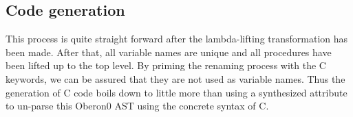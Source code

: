 \begin{comment}
The control flow extension \textit{does} provide equations for type checking,
however, for the same reason some type checking was done for desugaring previously:
error message quality.
%
Although the transformed trees should be semantically equivalent, that only
extends to whether it is accepted/rejected by analysis, not whether the error
messages generated are sensible.
%
It would be very confusing to see an error about an \texttt{IF} condition
not being a boolean when the program contains a \texttt{CASE} statement, instead.
%
By providing definitions for attributes involved in type checking, we can
get not only nice error messages, but also ensure the safety of composition.
\end{comment}

\begin{comment}
\paragraph{Dispatching} %
Forwarding takes on many roles in Silver specifications.
%
One common one in larger compilers, that's we've forced to take a slightly
contrived role in Oberon0, is that of \textit{dispatch}.
%
It's often the case that the behavior of a production as a whole will end up
very different depending, for example, what kind of identifier is referenced
by a name, as determined by an environment lookup.
%
In the Silver compiler itself, for example, a global value lookup and a local
value do not just have very different translations, but the type behavior is
different too: globals are quantified and should have their type variable freshened
before reporting a monotype, while locals are not.

For Oberon0, we have a special handler for the builtin procedure \texttt{WriteLn}
and so forth, becuase we need to give them a special translation.
%
To do this, the procedure call production \texttt{callDispatch} forwards to one
of \texttt{call}, \texttt{writeLnCall}, etc based on the procedure name.
\end{comment}

\subsection{Code generation}


This process is quite straight forward after the lambda-lifting
transformation has been made.  After that, all variable names are
unique and all procedures have been lifted up to the top level.  By
priming the renaming process with the C keywords, we can be assured
that they are not used as variable names.  Thus the generation of C
code boils down to little more than using a synthesized 
attribute to un-parse this Oberon0 AST using the concrete syntax of C.

